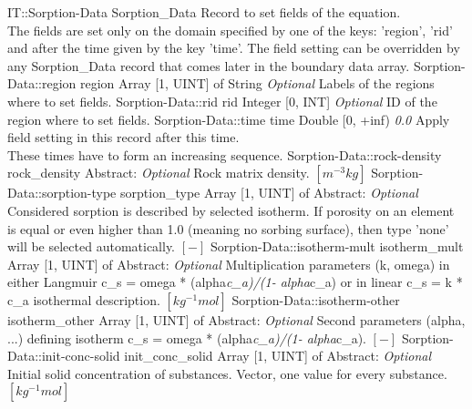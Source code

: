 \begin{RecordType}
	{IT::Sorption-Data}
	{Sorption{\_}Data}
	{} %
	{} %
	{{{Record to set fields of the equation.}\\{
The fields are set only on the domain specified by one of the keys: 'region', 'rid'}\\{
and after the time given by the key 'time'. The field setting can be overridden by}\\{
 any Sorption{\_}Data record that comes later in the boundary data array.}}}
		\RecKey
			{Sorption-Data::region}
			{region}
			{{Array [1, UINT] of }{String}}
			{ \it{Optional} }
			{{{Labels of the regions where to set fields. }}}
		\RecKey
			{Sorption-Data::rid}
			{rid}
			{{Integer [0, INT]}}
			{ \it{Optional} }
			{{{ID of the region where to set fields.}}}
		\RecKey
			{Sorption-Data::time}
			{time}
			{{Double [0, +inf)}}
			{ \it{0.0} }
			{{{Apply field setting in this record after this time.}\\{
These times have to form an increasing sequence.}}}
		\RecKey
			{Sorption-Data::rock-density}
			{rock{\_}density}
			{{Abstract}{: }}
			{ \it{Optional} }
			{{{Rock matrix density. }{$[m^{-3}kg]$}}}
		\RecKey
			{Sorption-Data::sorption-type}
			{sorption{\_}type}
			{{Array [1, UINT] of }{Abstract}{: }}
			{ \it{Optional} }
			{{{Considered sorption is described by selected isotherm. If porosity on an element is equal or even higher than 1.0 (meaning no sorbing surface), then type 'none' will be selected automatically. }{$[-]$}}}
		\RecKey
			{Sorption-Data::isotherm-mult}
			{isotherm{\_}mult}
			{{Array [1, UINT] of }{Abstract}{: }}
			{ \it{Optional} }
			{{{Multiplication parameters (k, omega) in either Langmuir c{\_}s = omega * (alpha}\textit{c{\_}a)/(1- alpha}{c{\_}a) or in linear c{\_}s = k * c{\_}a isothermal description. }{$[kg^{-1}mol]$}}}
		\RecKey
			{Sorption-Data::isotherm-other}
			{isotherm{\_}other}
			{{Array [1, UINT] of }{Abstract}{: }}
			{ \it{Optional} }
			{{{Second parameters (alpha, ...) defining isotherm  c{\_}s = omega * (alpha}\textit{c{\_}a)/(1- alpha}{c{\_}a). }{$[-]$}}}
		\RecKey
			{Sorption-Data::init-conc-solid}
			{init{\_}conc{\_}solid}
			{{Array [1, UINT] of }{Abstract}{: }}
			{ \it{Optional} }
			{{{Initial solid concentration of substances. Vector, one value for every substance. }{$[kg^{-1}mol]$}}}
\end{RecordType}
